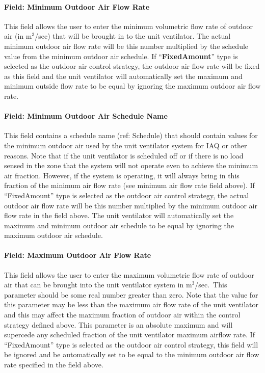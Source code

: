 \paragraph{Field: Minimum Outdoor Air Flow Rate}\label{field-minimum-outdoor-air-flow-rate-002}

This field allows the user to enter the minimum volumetric flow rate of outdoor air (in m\(^{3}\)/sec) that will be brought in to the unit ventilator. The actual minimum outdoor air flow rate will be this number multiplied by the schedule value from the minimum outdoor air schedule. If ``\textbf{FixedAmount}'' type is selected as the outdoor air control strategy, the outdoor air flow rate will be fixed as this field and the unit ventilator will automatically set the maximum and minimum outside flow rate to be equal by ignoring the maximum outdoor air flow rate.

\paragraph{Field: Minimum Outdoor Air Schedule Name}\label{field-minimum-outdoor-air-schedule-name-002}

This field contains a schedule name (ref: Schedule) that should contain values for the minimum outdoor air used by the unit ventilator system for IAQ or other reasons. Note that if the unit ventilator is scheduled off or if there is no load sensed in the zone that the system will not operate even to achieve the minimum air fraction. However, if the system is operating, it will always bring in this fraction of the minimum air flow rate (see minimum air flow rate field above). If ``FixedAmount'' type is selected as the outdoor air control strategy, the actual outdoor air flow rate will be this number multiplied by the minimum outdoor air flow rate in the field above. The unit ventilator will automatically set the maximum and minimum outdoor air schedule to be equal by ignoring the maximum outdoor air schedule.

\paragraph{Field: Maximum Outdoor Air Flow Rate}\label{field-maximum-outdoor-air-flow-rate-1-000}

This field allows the user to enter the maximum volumetric flow rate of outdoor air that can be brought into the unit ventilator system in m\(^{3}\)/sec.~This parameter should be some real number greater than zero. Note that the value for this parameter may be less than the maximum air flow rate of the unit ventilator and this may affect the maximum fraction of outdoor air within the control strategy defined above. This parameter is an absolute maximum and will supercede any scheduled fraction of the unit ventilator maximum airflow rate. If ``FixedAmount'' type is selected as the outdoor air control strategy, this field will be ignored and be automatically set to be equal to the minimum outdoor air flow rate specified in the field above.

